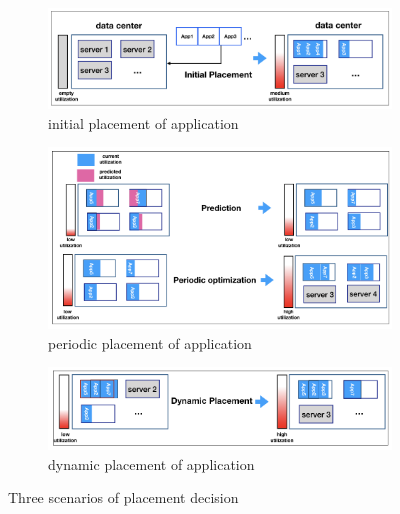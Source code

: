 \begin{figure}
	\centering
	\begin{subfigure}[b]{0.9\textwidth}
		\includegraphics[width=\textwidth]{pics/initial_placement.png}
		\caption{initial placement of application}
	\end{subfigure}
	\begin{subfigure}[b]{0.9\textwidth}
		\includegraphics[width=\textwidth]{pics/periodic_optimization.png}
	\caption{periodic placement of application}
	\end{subfigure}
	\begin{subfigure}[b]{0.9\textwidth}
		\includegraphics[width=\textwidth]{pics/dynamic_placement.png}
	\caption{dynamic placement of application}
	\end{subfigure}
	\caption{Three scenarios of placement decision}
	\label{fig:management}
\end{figure}

